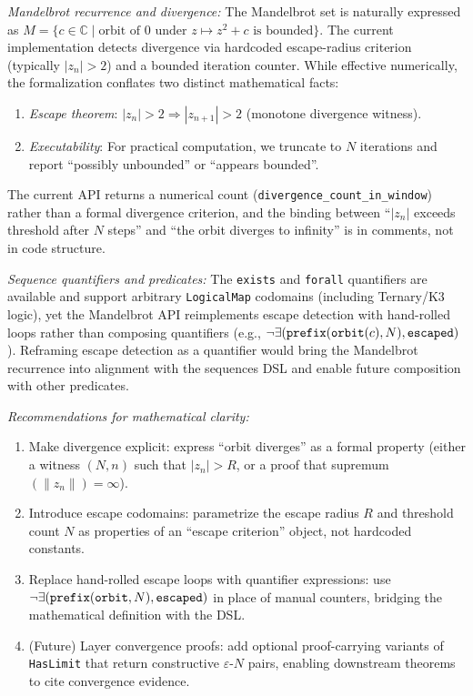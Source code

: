 \documentclass[11pt, a4paper]{report}
\begin{document}
\textit{Mandelbrot recurrence and divergence:} The Mandelbrot set is naturally expressed as $M = \{ c \in \mathbb{C} \mid \text{orbit of } 0 \text{ under } z \mapsto z^2 + c \text{ is bounded} \}$. The current implementation detects divergence via hardcoded escape-radius criterion (typically $|z_n| > 2$) and a bounded iteration counter. While effective numerically, the formalization conflates two distinct mathematical facts:
\begin{enumerate}
  \item \textit{Escape theorem}: $|z_n| > 2 \Rightarrow |z_{n+1}| > 2$ (monotone divergence witness).
  \item \textit{Executability}: For practical computation, we truncate to $N$ iterations and report ``possibly unbounded'' or ``appears bounded''.
\end{enumerate}
The current API returns a numerical count (\texttt{divergence\_count\_in\_window}) rather than a formal divergence criterion, and the binding between ``$|z_n|$ exceeds threshold after $N$ steps'' and ``the orbit diverges to infinity'' is in comments, not in code structure.

\textit{Sequence quantifiers and predicates:} The \texttt{exists} and \texttt{forall} quantifiers are available and support arbitrary \texttt{LogicalMap} codomains (including Ternary/K3 logic), yet the Mandelbrot API reimplements escape detection with hand-rolled loops rather than composing quantifiers (e.g., $\neg \exists({\tt prefix}({\tt orbit}(c), N), {\tt escaped})$). Reframing escape detection as a quantifier would bring the Mandelbrot recurrence into alignment with the sequences DSL and enable future composition with other predicates.

\textit{Recommendations for mathematical clarity:}
\begin{enumerate}
  \item Make divergence explicit: express ``orbit diverges'' as a formal property (either a witness $(N, n)$ such that $|z_n| > R$, or a proof that supremum$(\|z_n\|) = \infty$).
  \item Introduce escape codomains: parametrize the escape radius $R$ and threshold count $N$ as properties of an ``escape criterion'' object, not hardcoded constants.
  \item Replace hand-rolled escape loops with quantifier expressions: use $\neg \exists({\tt prefix}({\tt orbit}, N), {\tt escaped})$ in place of manual counters, bridging the mathematical definition with the DSL.
  \item (Future) Layer convergence proofs: add optional proof-carrying variants of \texttt{HasLimit} that return constructive $\varepsilon$-$N$ pairs, enabling downstream theorems to cite convergence evidence.
\end{enumerate}
\end{document}
